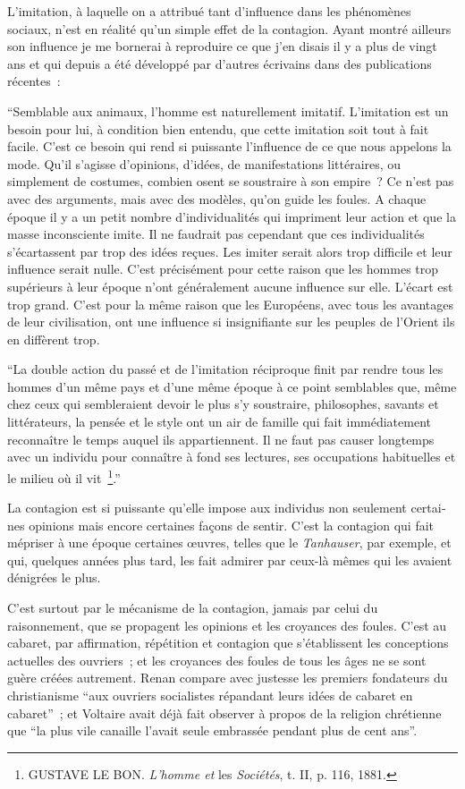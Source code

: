 \documentclass[french,twoside]{book} %
\begin{document}
L’imitation, à laquelle on a attribué tant d’influence dans les phénomènes sociaux, n’est en réalité qu’un simple effet de la contagion. Ayant montré ailleurs son influence je me bornerai à reproduire ce que j’en disais il y a plus de vingt ans et qui depuis a été développé par d’autres écrivains dans des publications récentes :\par
“Semblable aux animaux, l’homme est naturellement imitatif. L’imitation est un besoin pour lui, à condition bien entendu, que cette imitation soit tout à fait facile. C’est ce besoin qui rend si puissante l’influence de ce que nous appelons la mode. Qu’il s’agisse d’opinions, d’idées, de manifestations littéraires, ou simplement de costumes, combien osent se soustraire à son empire ? Ce n’est pas avec des argu­ments, mais avec des modèles, qu’on guide les foules. A chaque époque il y a un petit nombre d’individualités qui impriment leur action et que la masse inconsciente imite. Il ne faudrait pas cependant que ces individualités s’écartassent par trop des idées reçues. Les imiter serait alors trop difficile et leur influence serait nulle. C’est préci­sément pour cette raison que les hommes trop supérieurs à leur époque n’ont généralement aucune influence sur elle. L’écart est trop grand. C’est pour la même raison que les Européens, avec tous les avantages de leur civilisation, ont une influence si insignifiante sur les peuples de l’Orient ils en diffèrent trop.\par
“La double action du passé et de l’imitation réciproque finit par rendre tous les hommes d’un même pays et d’une même époque à ce point semblables que, même chez ceux qui sembleraient devoir le plus s’y soustraire, philosophes, savants et littérateurs, la pensée et le style ont un air de famille qui fait immédiatement recon­naître le temps auquel ils appartiennent. Il ne faut pas causer longtemps avec un individu pour connaître à fond ses lectures, ses occupations habituelles et le milieu où il vit \footnote{GUSTAVE LE BON. \emph{L’homme et} les \emph{Sociétés}, t. II, p. 116, 1881.}.”\par
La contagion est si puissante qu’elle impose aux individus non seulement certai­nes opinions mais encore certaines façons de sentir. C’est la contagion qui fait mépriser à une époque certaines œuvres, telles que le \emph{Tanhauser}, par exemple, et qui, quelques années plus tard, les fait admirer par ceux-là mêmes qui les avaient déni­grées le plus.\par
C’est surtout par le mécanisme de la contagion, jamais par celui du raisonnement, que se propagent les opinions et les croyances des foules. C’est au cabaret, par affirmation, répétition et contagion que s’établissent les conceptions actuelles des ouvriers ; et les croyances des foules de tous les âges ne se sont guère créées autre­ment. Renan compare avec justesse les premiers fondateurs du christianisme “aux ouvriers socialistes répandant leurs idées de cabaret en cabaret” ; et Voltaire avait déjà fait observer à propos de la religion chrétienne que “la plus vile canaille l’avait seule embrassée pendant plus de cent ans”.\par
\end{document}
